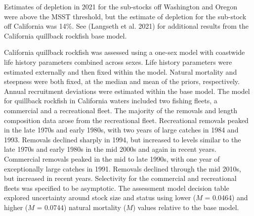 \documentclass[11pt,
  english,
  a4paper,
]{article}
\begin{document}
\leavevmode\tagmcend\tagstructend\par


Estimates of depletion in 2021 for the sub-stocks off Washington and Oregon were above the MSST threshold, but the estimate of depletion for the sub-stock off California was 14\%. See {(Langseth et al. 2021)\leavevmode\tagmcend\tagstructend} for additional results from the California quillback rockfish base model.

\leavevmode\tagmcend\tagstructend\par


California quillback rockfish was assessed using a one-sex model with coastwide life history parameters combined across sexes. Life history parameters were estimated externally and then fixed within the model. Natural mortality and steepness were both fixed, at the median and mean of the priors, respectively. Annual recruitment deviations were estimated within the base model. The model for quillback rockfish in California waters included two fishing fleets, a commercial and a recreational fleet. The majority of the removals and length composition data arose from the recreational fleet. Recreational removals peaked in the late 1970s and early 1980s, with two years of large catches in 1984 and 1993. Removals declined sharply in 1994, but increased to levels similar to the late 1970s and early 1980s in the mid 2000s and again in recent years. Commercial removals peaked in the mid to late 1990s, with one year of exceptionally large catches in 1991. Removals declined through the mid 2010s, but increased in recent years. Selectivity for the commercial and recreational fleets was specified to be asymptotic. The assessment model decision table explored uncertainty around stock size and status using lower ({\(M\)\leavevmode\tagmcend\tagstructend} = 0.0464) and higher ({\(M\)\leavevmode\tagmcend\tagstructend} = 0.0744) natural mortality ({\(M\)\leavevmode\tagmcend\tagstructend}) values relative to the base model.

\leavevmode\tagmcend\tagstructend\par

\end{document}
